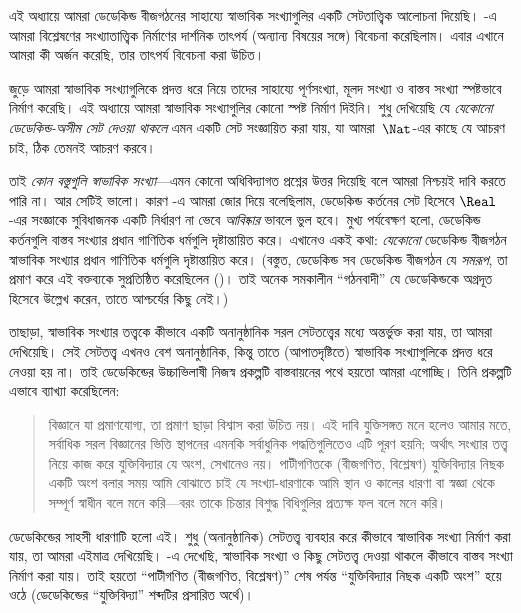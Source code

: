 \documentclass[../../../include/open-logic-section]{subfiles}
\begin{document}


এই অধ্যায়ে আমরা ডেডেকিন্ড বীজগঠনের সাহায্যে স্বাভাবিক সংখ্যাগুলির একটি সেটতাত্ত্বিক আলোচনা দিয়েছি। -এ আমরা বিশ্লেষণের সংখ্যাতাত্ত্বিক নির্মাণের দার্শনিক তাৎপর্য (অন্যান্য বিষয়ের সঙ্গে) বিবেচনা করেছিলাম। এবার এখানে আমরা কী অর্জন করেছি, তার তাৎপর্য বিবেচনা করা উচিত।

 জুড়ে আমরা স্বাভাবিক সংখ্যাগুলিকে প্রদত্ত ধরে নিয়ে তাদের সাহায্যে পূর্ণসংখ্যা, মূলদ সংখ্যা ও বাস্তব সংখ্যা স্পষ্টভাবে নির্মাণ করেছি। এই অধ্যায়ে আমরা স্বাভাবিক সংখ্যাগুলির কোনো স্পষ্ট নির্মাণ দিইনি। শুধু দেখিয়েছি যে \emph{যেকোনো ডেডেকিন্ড-অসীম সেট দেওয়া থাকলে} এমন একটি সেট সংজ্ঞায়িত করা যায়, যা আমরা~$\Nat$-এর কাছে যে আচরণ চাই, ঠিক তেমনই আচরণ করবে।

তাই \emph{কোন বস্তুগুলি স্বাভাবিক সংখ্যা}—এমন কোনো অধিবিদ্যাগত প্রশ্নের উত্তর দিয়েছি বলে আমরা নিশ্চয়ই দাবি করতে পারি না। আর সেটিই ভালো। কারণ -এ আমরা জোর দিয়ে বলেছিলাম, ডেডেকিন্ড কর্তনের সেট হিসেবে $\Real$-এর সংজ্ঞাকে সুবিধাজনক একটি নির্ধারণ না ভেবে \emph{আবিষ্কার} ভাবলে ভুল হবে। মুখ্য পর্যবেক্ষণ হলো, ডেডেকিন্ড কর্তনগুলি বাস্তব সংখ্যার প্রধান গাণিতিক ধর্মগুলি দৃষ্টান্তায়িত করে। এখানেও একই কথা: \emph{যেকোনো} ডেডেকিন্ড বীজগঠন স্বাভাবিক সংখ্যার প্রধান গাণিতিক ধর্মগুলি দৃষ্টান্তায়িত করে। (বস্তুত, ডেডেকিন্ড সব ডেডেকিন্ড বীজগঠন যে \emph{সমরূপ}, তা প্রমাণ করে এই বক্তব্যকে সুপ্রতিষ্ঠিত করেছিলেন (\citeyear[Theorems
132--3]{Dedekind1888})। তাই অনেক সমকালীন ``গঠনবাদী'' যে ডেডেকিন্ডকে অগ্রদূত হিসেবে উল্লেখ করেন, তাতে আশ্চর্যের কিছু নেই।)

তাছাড়া, স্বাভাবিক সংখ্যার তত্ত্বকে কীভাবে একটি অনানুষ্ঠানিক সরল সেটতত্ত্বের মধ্যে অন্তর্ভুক্ত করা যায়, তা আমরা দেখিয়েছি। সেই সেটতত্ত্ব এখনও বেশ অনানুষ্ঠানিক, কিন্তু তাতে (আপাতদৃষ্টিতে) স্বাভাবিক সংখ্যাগুলিকে প্রদত্ত ধরে নেওয়া হয় না। তাই ডেডেকিন্ডের উচ্চাভিলাষী নিজস্ব প্রকল্পটি বাস্তবায়নের পথে হয়তো আমরা এগোচ্ছি। তিনি প্রকল্পটি এভাবে ব্যাখ্যা করেছিলেন:
\begin{quote}
	বিজ্ঞানে যা প্রমাণযোগ্য, তা প্রমাণ ছাড়া বিশ্বাস করা উচিত নয়। এই দাবি যুক্তিসঙ্গত মনে হলেও আমার মতে, সর্বাধিক সরল বিজ্ঞানের ভিত্তি স্থাপনের এমনকি সর্বাধুনিক পদ্ধতিগুলিতেও এটি পূরণ হয়নি; অর্থাৎ সংখ্যার তত্ত্ব নিয়ে কাজ করে যুক্তিবিদ্যার যে অংশ, সেখানেও নয়। পাটীগণিতকে (বীজগণিত, বিশ্লেষণ) যুক্তিবিদ্যার নিছক একটি অংশ বলার সময় আমি বোঝাতে চাই যে সংখ্যা-ধারণাকে আমি স্থান ও কালের ধারণা বা স্বজ্ঞা থেকে সম্পূর্ণ স্বাধীন বলে মনে করি—বরং তাকে চিন্তার বিশুদ্ধ বিধিগুলির প্রত্যক্ষ ফল বলে মনে করি।
	\citep[preface]{Dedekind1888}
\end{quote}
ডেডেকিন্ডের সাহসী ধারণাটি হলো এই। শুধু (অনানুষ্ঠানিক) সেটতত্ত্ব ব্যবহার করে কীভাবে স্বাভাবিক সংখ্যা নির্মাণ করা যায়, তা আমরা এইমাত্র দেখিয়েছি। -এ দেখেছি, স্বাভাবিক সংখ্যা ও কিছু সেটতত্ত্ব দেওয়া থাকলে কীভাবে বাস্তব সংখ্যা নির্মাণ করা যায়। তাই হয়তো ``পাটীগণিত (বীজগণিত, বিশ্লেষণ)'' শেষ পর্যন্ত ``যুক্তিবিদ্যার নিছক একটি অংশ'' হয়ে ওঠে (ডেডেকিন্ডের ``যুক্তিবিদ্যা'' শব্দটির প্রসারিত অর্থে)।
\end{document}
